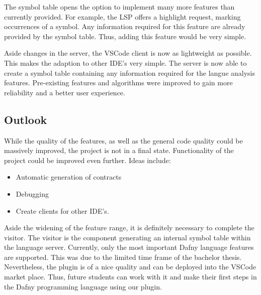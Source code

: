 The symbol table opens the option to implement many more features than currently provided.
For example, the LSP offers a highlight request, marking occurrences of a symbol.
Any information required for this feature are already provided by the symbol table.
Thus, adding this feature would be very simple.


Aside changes in the server, the VSCode client is now as lightweight as possible.
This makes the adaption to other IDE's very simple.
The server is now able to create a symbol table containing any information required for the langue analysis features.
Pre-existing features and algorithms were improved to gain more reliability and a better user experience.



\subsection{Outlook}
While the quality of the features, as well as the general code quality could be massively improved, the project is not in a final state.
Functionality of the project could be improved even further.
Ideas include:
\begin{itemize}
    \item Automatic generation of contracts
    \item Debugging
    \item Create clients for other IDE's.
\end{itemize}
Aside the widening of the feature range, it is definitely necessary to complete the visitor.
The visitor is the component generating an internal symbol table within the language server.
Currently, only the most important Dafny language features are supported.
This was due to the limited time frame of the bachelor thesis.
Nevertheless, the plugin is of a nice quality and can be deployed into the VSCode market place.
Thus, future students can work with it and make their first steps in the Dafny programming language using our plugin.